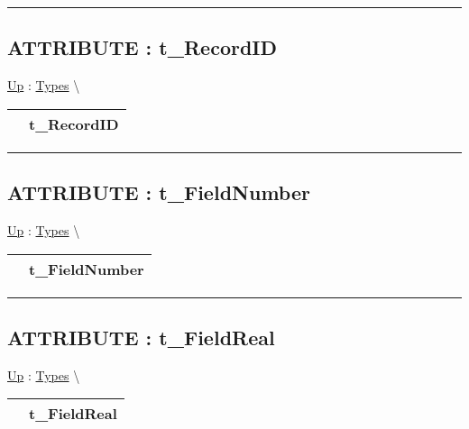 \rule{\linewidth}{0.5pt}

\subsection*{ATTRIBUTE : t\_RecordID}
\hypertarget{ecldoc:ml_core.types.t_recordid}{}
\hyperlink{ecldoc:ML_Core.Types}{Up} :
\hspace{0pt} \hyperlink{ecldoc:ML_Core.Types}{Types} \textbackslash 

{\renewcommand{\arraystretch}{1.5}
\begin{tabularx}{\textwidth}{|>{\raggedright\arraybackslash}l|X|}
\hline
\hspace{0pt} & t\_RecordID \\
\hline
\end{tabularx}
}

\par


\rule{\linewidth}{0.5pt}
\subsection*{ATTRIBUTE : t\_FieldNumber}
\hypertarget{ecldoc:ml_core.types.t_fieldnumber}{}
\hyperlink{ecldoc:ML_Core.Types}{Up} :
\hspace{0pt} \hyperlink{ecldoc:ML_Core.Types}{Types} \textbackslash 

{\renewcommand{\arraystretch}{1.5}
\begin{tabularx}{\textwidth}{|>{\raggedright\arraybackslash}l|X|}
\hline
\hspace{0pt} & t\_FieldNumber \\
\hline
\end{tabularx}
}

\par


\rule{\linewidth}{0.5pt}
\subsection*{ATTRIBUTE : t\_FieldReal}
\hypertarget{ecldoc:ml_core.types.t_fieldreal}{}
\hyperlink{ecldoc:ML_Core.Types}{Up} :
\hspace{0pt} \hyperlink{ecldoc:ML_Core.Types}{Types} \textbackslash 

{\renewcommand{\arraystretch}{1.5}
\begin{tabularx}{\textwidth}{|>{\raggedright\arraybackslash}l|X|}
\hline
\hspace{0pt} & t\_FieldReal \\
\hline
\end{tabularx}
}

